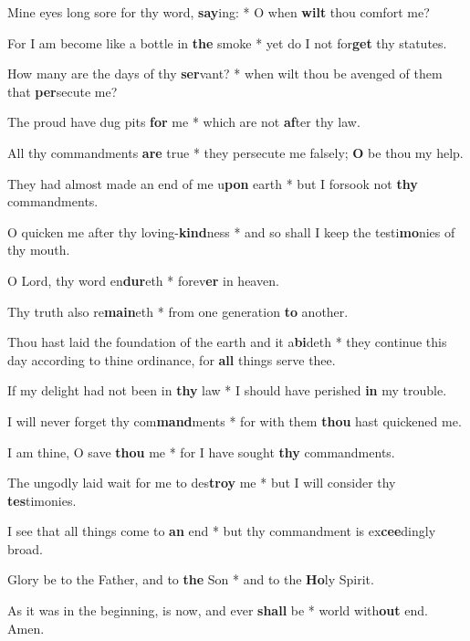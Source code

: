 \begin{multicols}{2}
	Mine eyes long sore for thy word, \textbf{say}ing: * O when \textbf{wilt} thou comfort me?
	
	For I am become like a bottle in \textbf{the} smoke * yet do I not for\textbf{get} thy statutes.
	
	How many are the days of thy \textbf{ser}vant? * when wilt thou be avenged of them that \textbf{per}secute me?
	
	The proud have dug pits \textbf{for} me * which are not \textbf{af}ter thy law.
	
	All thy commandments \textbf{are} true * they persecute me falsely; \textbf{O} be thou my help.
	
	They had almost made an end of me u\textbf{pon} earth * but I forsook not \textbf{thy} commandments.
	
	O quicken me after thy loving-\textbf{kind}ness * and so shall I keep the testi\textbf{mo}nies of thy mouth.
	
	O Lord, thy word en\textbf{dur}eth * forev\textbf{er} in heaven.
	
	Thy truth also re\textbf{main}eth * from one generation \textbf{to} another.
	
	Thou hast laid the foundation of the earth and it a\textbf{bi}deth * they continue this day according to thine ordinance, for \textbf{all} things serve thee.
	
	If my delight had not been in \textbf{thy} law * I should have perished \textbf{in} my trouble.
	
	I will never forget thy com\textbf{mand}ments * for with them \textbf{thou} hast quickened me.
	
	I am thine, O save \textbf{thou} me * for I have sought \textbf{thy} commandments.
	
	The ungodly laid wait for me to des\textbf{troy} me * but I will consider thy \textbf{tes}timonies.
	
	I see that all things come to \textbf{an} end * but thy commandment is ex\textbf{cee}dingly broad.
	
	Glory be to the Father, and to \textbf{the} Son * and to the \textbf{Ho}ly Spirit.
	
	As it was in the beginning, is now, and ever \textbf{shall} be * world with\textbf{out} end. Amen.
\end{multicols}